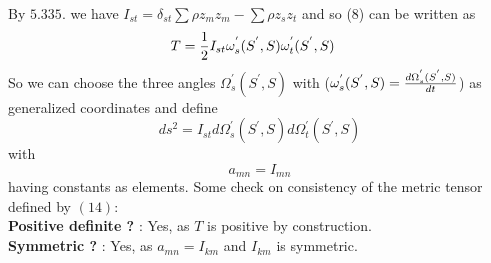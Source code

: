 By $\mathbf{5.335.}$ we have $ I_{st} = \delta_{st}\mathbf{\sum}\rho z_mz_m-\mathbf{\sum}\rho z_sz_t$ and so (8) can be written as
\begin{align}
T&=\frac{1}{2} I_{st}\omega^{'}_{s}(S^{'},S)\omega^{'}_{t}(S^{'},S)
\end{align} 
So we can choose the three angles $\Omega^{'}_{s}(S^{'},S)$  with ($\omega^{'}_{s}(S^{'},S)= \dv{\Omega^{'}_{s}(S^{'},S)}{t}$) as generalized coordinates and define $$ds^2=I_{st}d\Omega^{'}_{s}(S^{'},S)d\Omega^{'}_{t}(S^{'},S)$$ with  $$a_{mn} = I_{mn}$$ having constants as elements.
Some check on consistency of the metric tensor defined by $(14)$:\\
\textbf{Positive definite ?} : Yes, as $T$ is positive by construction.\\
\textbf{Symmetric ?} : Yes, as $a_{mn} = I_{km}$ and $I_{km}$ is symmetric.  \\
